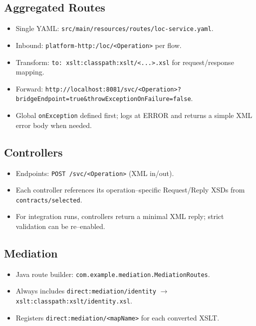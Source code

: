 \documentclass[11pt]{article}
\begin{document}
\subsection{Aggregated Routes}
\begin{itemize}
  \item Single YAML: \texttt{src/main/resources/routes/loc-service.yaml}.
  \item Inbound: \texttt{platform-http:/loc/<Operation>} per flow.
  \item Transform: \texttt{to: xslt:classpath:xslt/<...>.xsl} for request/response mapping.
  \item Forward: \texttt{http://localhost:8081/svc/<Operation>?bridgeEndpoint=true\&throwExceptionOnFailure=false}.
  \item Global \texttt{onException} defined first; logs at ERROR and returns a simple XML error body when needed.
\end{itemize}

\subsection{Controllers}
\begin{itemize}
  \item Endpoints: \texttt{POST /svc/<Operation>} (XML in/out).
  \item Each controller references its operation–specific Request/Reply XSDs from \texttt{contracts/selected}.
  \item For integration runs, controllers return a minimal XML reply; strict validation can be re–enabled.
\end{itemize}

\subsection{Mediation}
\begin{itemize}
  \item Java route builder: \texttt{com.example.mediation.MediationRoutes}.
  \item Always includes \texttt{direct:mediation/identity} \(\to\) \texttt{xslt:classpath:xslt/identity.xsl}.
  \item Registers \texttt{direct:mediation/<mapName>} for each converted XSLT.
\end{itemize}
\end{document}
